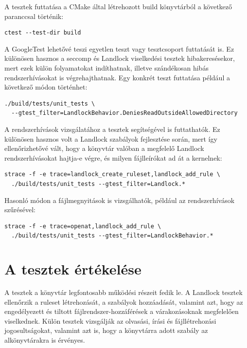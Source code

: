 A tesztek futtatása a CMake által létrehozott build könyvtárból a következő
paranccsal történik:

\begin{verbatim}
ctest --test-dir build
\end{verbatim}

A GoogleTest lehetővé teszi egyetlen teszt vagy tesztcsoport futtatását is.
Ez különösen hasznos a seccomp és Landlock viselkedési tesztek hibakeresésekor,
mert ezek külön folyamatokat indíthatnak, illetve szándékosan hibás
rendszerhívásokat is végrehajthatnak. Egy konkrét teszt futtatása például a
következő módon történhet:

\begin{verbatim}
./build/tests/unit_tests \
  --gtest_filter=LandlockBehavior.DeniesReadOutsideAllowedDirectory
\end{verbatim}

A rendszerhívások vizsgálatához a tesztek  segítségével is
futtathatók. Ez különösen hasznos volt a Landlock szabályok fejlesztése során,
mert így ellenőrizhetővé vált, hogy a könyvtár valóban a megfelelő Landlock
rendszerhívásokat hajtja-e végre, és milyen fájlleírókat ad át a kernelnek:

\begin{verbatim}
strace -f -e trace=landlock_create_ruleset,landlock_add_rule \
  ./build/tests/unit_tests --gtest_filter=Landlock.*
\end{verbatim}

Hasonló módon a fájlmegnyitások is vizsgálhatók, például az
 rendszerhívások szűrésével:

\begin{verbatim}
strace -f -e trace=openat,landlock_add_rule \
  ./build/tests/unit_tests --gtest_filter=LandlockBehavior.*
\end{verbatim}

\section{A tesztek értékelése}

A tesztek a könyvtár legfontosabb működési részeit fedik le. A Landlock tesztek
ellenőrzik a ruleset létrehozását, a szabályok hozzáadását, valamint azt, hogy
az engedélyezett és tiltott fájlrendszer-hozzáférések a várakozásoknak
megfelelően viselkednek. Külön tesztek vizsgálják az olvasási, írási és
fájllétrehozási jogosultságokat, valamint azt is, hogy a könyvtárra adott
szabály az alkönyvtárakra is érvényes.


